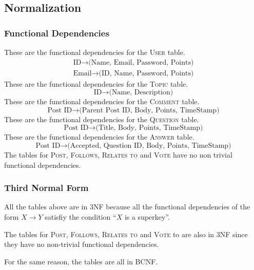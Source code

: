 \subsection{Normalization}
\subsubsection{Functional Dependencies}
These are the functional dependencies for the \textsc{User} table.
\begin{gather*}
	\text{ID} \to \text{(Name, Email, Password, Points)} \\
	\text{Email} \to \text{(ID, Name, Password, Points)}
\end{gather*}
These are the functional dependencies for the \textsc{Topic} table.
\[\text{ID} \to \text{(Name, Description)}\]
These are the functional dependencies for the \textsc{Comment} table.
\[\text{Post ID} \to \text{(Parent Post ID, Body, Points, TimeStamp)}\]
These are the functional dependencies for the \textsc{Question} table.
\[\text{Post ID} \to \text{(Title, Body, Points, TimeStamp)}\]
These are the functional dependencies for the \textsc{Answer} table.
\[\text{Post ID} \to \text{(Accepted, Question ID, Body, Points, TimeStamp)}\]
The tables for \textsc{Post}, \textsc{Follows}, \textsc{Relates to} and \textsc{Vote} have no non trivial functional dependencies.


\subsubsection{Third Normal Form}
All the tables above are in 3NF because all the functional dependencies of the form \(X \to Y\) satisfiy the condition ``\(X\) is a superkey''.

The tables for \textsc{Post}, \textsc{Follows}, \textsc{Relates to} and \textsc{Vote} to are also in 3NF since they have no non-trivial functional dependencies.

For the same reason, the tables are all in BCNF.